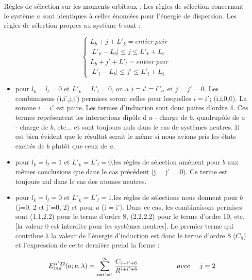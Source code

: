 Règles de sélection sur les moments orbitaux :
Les règles de sélection concernant le système $a$ sont identiques à celles énoncées pour l'énergie de dispersion.
Les règles de sélection propres au système $b$ sont : 
	
\begin{equation}
   \begin{cases}
	L_{b} + j + L'_{k} = entier\ pair \\
	|L'_{k} - L_{b}| \leq j \leq L'_{k} + L_{b} \\
	L_{b} + j' + L'_{l} = entier\ pair \\
	|L'_{l} - L_{b}| \leq j' \leq L'_{l} + L_{b}
   \end{cases}
\end{equation}

\begin{itemize}
	\item pour $l_{k} = l_{l} = 0 $ et  $L'_{k} = L'_{l} = 0$, on a $i = i' = l"_{a}$ et $j= j' = 0$. Les combinaisons (i,i',j,j') permises seront celles pour lesquelles $i = i'$; (i,i,0,0). La somme $i = i'$ est paire. Les termes d'induction sont donc paires d'ordre 4. Ces termes représentent les interactions dipôle d $a$ - charge de $b$, quadrupôle de $a$ - charge de $b$, etc... et sont toujours nuls dans le cas de systèmes neutres. Il est bien évident que le résultat serait le même si nous avions pris les états excités de $b$ plutôt que ceux de $a$. 
	\item pour $l_{k} = l_{l} = 1 $ et  $L'_{k} = L'_{l} = 0$,les règles de sélection amènent pour $b$ aux mêmes conclusions que dans le cas précédent (j = j' = 0). Ce terme est toujours nul dans le cas des atomes neutres.
	\item pour $l_{k} = l_{l} = 0 $ et  $L'_{k} = L'_{l} = 1$,les règles de sélections nous donnent pour $b$ (j=0, 2 et j'=0, 2) et pour $a$ (i = i'). Dans ce cas, les combinaisons permises sont (1,1,2,2) pour le terme d'ordre 8, (2,2,2,2) pour le terme d'ordre 10, etc. [la valeur 0 est interdite pour les systèmes neutres]. Le premier terme qui contribue à la valeur de l'énergie d'induction est donc le terme d'ordre 8 ($C_{8}$) et l'expression de cette dernière prend la forme : 
		
\begin{equation}
	E_{ind}^{ii'22} (a;\nu , \lambda) = \sum_{i=i'=1}^{\infty} \frac{C_{i+i'+6}}{R^{i+i'+6}} \hspace{2cm} avec \hspace{0.5cm} j = 2
\end{equation}
		
\end{itemize}

